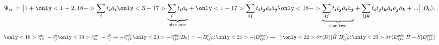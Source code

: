 \documentclass{beamer}
\begin{document}
\begin{frame}
\begin{center}
\begin{tikzpicture}[scale=.7,every node/.style={minimum size=1cm},on grid]
			\end{tikzpicture}
		\end{center}	
\begin{equation*}
\Psi_{cc} = \big[1 +\only<1-2,18->{\sum_{\boldsymbol{i}} t_{\boldsymbol{i}}\hat{a}_{\boldsymbol{i}}\vphantom{\underbrace{\sum_{\boldsymbol{i}} t_{\boldsymbol{i}}\hat{a}_{\boldsymbol{i}}}_\text{size one}}}\only<3-17>{\underbrace{\sum_{\boldsymbol{i}} t_{\boldsymbol{i}}\hat{a}_{\boldsymbol{i}}}_\text{size one}}+
\only<1-17>{\sum_{\boldsymbol{ij}} t_{\boldsymbol{i}} t_{\boldsymbol{j}} \hat{a}_{\boldsymbol{i}} \hat{a}_{\boldsymbol{j}}}\vphantom{\underbrace{\sum_{\boldsymbol{ij}} t_{\boldsymbol{i}} t_{\boldsymbol{j}} \hat{a}_{\boldsymbol{i}} \hat{a}_{\boldsymbol{j}}}_\text{size two}}
\only<18->{\underbrace{\sum_{\boldsymbol{ij}} t_{\boldsymbol{i}} t_{\boldsymbol{j}} \hat{a}_{\boldsymbol{i}} \hat{a}_{\boldsymbol{j}}}_\text{size two}}
+ \sum_{\boldsymbol{ijk}}t_{\boldsymbol{i}} t_{\boldsymbol{j}} t_{\boldsymbol{k}} \hat{a}_{\boldsymbol{i}} \hat{a}_{\boldsymbol{j}} \hat{a}_{\boldsymbol{k}} + ...  \big]|D_0\rangle.
\end{equation*}
\begin{equation*}
\only<18>{\hat{c}_{ik}^{ac} \ -\hat{c}_j^b}
\only<19>{\hat{c}_{ik}^{ac} \ -\hat{c}_j^b \rightarrow -\hat{c}_{ijk}^{abc}}
\only<20>{-\hat{c}_{ijk}^{abc}|D_0\rangle = -|D_{ijk}^{abc}\rangle}
\only<21>{-|D_{ijk}^{abc}\rangle \rightarrow \ \ ^c_i}
\only<22>{\delta\tau \langle D_i^c |\hat{H}|D_{ijk}^{abc}\rangle }
\only<23>{\delta\tau \langle D_{ijk}^{abc} |\hat{H}-S|D_{ijk}^{abc}\rangle }
\end{equation*}
\end{frame}
\end{document}
